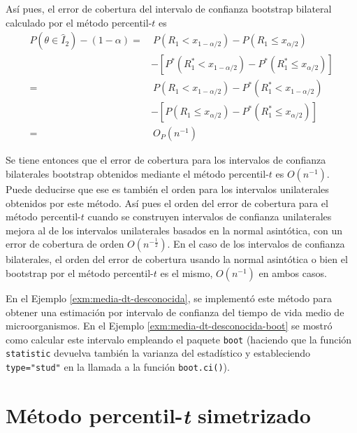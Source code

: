 \documentclass[]{book}
\theoremstyle{definition}
\theoremstyle{definition}
\theoremstyle{definition}
\theoremstyle{remark}
\begin{document}
Así pues, el error de cobertura del intervalo de confianza bootstrap
bilateral calculado por el método percentil-\(t\) es \[\begin{aligned}
P\left( \theta \in \hat{I}_2 \right) -\left( 1-\alpha \right) =&\  P\left(
R_1<x_{1-\alpha /2} \right) -P\left( R_1\leq x_{\alpha /2} \right) \\
& -\left[ P^{\ast}\left( R_1^{\ast}<x_{1-\alpha /2} \right) -P^{\ast
}\left( R_1^{\ast}\leq x_{\alpha /2} \right) \right] \\
=&\  P\left( R_1<x_{1-\alpha /2} \right) -P^{\ast}\left( R_1^{\ast
}<x_{1-\alpha /2} \right) \\
&-\left[ P\left( R_1\leq x_{\alpha /2} \right) -P^{\ast}\left(
R_1^{\ast}\leq x_{\alpha /2} \right) \right] \\
=&\  O_{P}\left( n^{-1} \right)
\end{aligned}\]

Se tiene entonces que el error de cobertura para los intervalos de
confianza bilaterales bootstrap obtenidos mediante el método
percentil-\(t\) es \(O\left( n^{-1} \right)\). Puede deducirse que ese
es también el orden para los intervalos unilaterales obtenidos por este
método. Así pues el orden del error de cobertura para el método
percentil-\(t\) cuando se construyen intervalos de confianza
unilaterales mejora al de los intervalos unilaterales basados en la
normal asintótica, con un error de cobertura de orden
\(O\left( n^{-\frac{1}{2}} \right)\). En el caso de los intervalos de
confianza bilaterales, el orden del error de cobertura usando la normal
asintótica o bien el bootstrap por el método percentil-\(t\) es el
mismo, \(O\left( n^{-1} \right)\) en ambos casos.

En el Ejemplo \ref{exm:media-dt-desconocida}, se implementó este método
para obtener una estimación por intervalo de confianza del tiempo de
vida medio de microorganismos. En el Ejemplo
\ref{exm:media-dt-desconocida-boot} se mostró como calcular este
intervalo empleando el paquete \texttt{boot} (haciendo que la función
\texttt{statistic} devuelva también la varianza del estadístico y
estableciendo \texttt{type="stud"} en la llamada a la función
\texttt{boot.ci()}).

\section{\texorpdfstring{Método percentil-\emph{t}
simetrizado}{Método percentil-t simetrizado}}\label{cap5-perc-t-sim}
\end{document}
